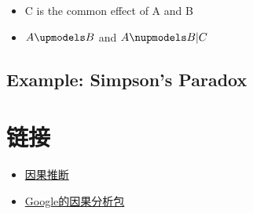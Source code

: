 \documentclass[]{book}
\providecommand{\tightlist}{%
  \setlength{\itemsep}{0pt}\setlength{\parskip}{0pt}}
\begin{document}
\begin{itemize}
\tightlist
\item
  C is the common effect of A and B
\item
  \(A \upmodels B\) and \(A \nupmodels B|C\)
\end{itemize}

\hypertarget{example-simpsons-paradox}{%
\subsection{Example: Simpson's Paradox}\label{example-simpsons-paradox}}

\hypertarget{yinguolink}{%
\section{链接}\label{yinguolink}}

\begin{itemize}
\tightlist
\item
  \href{https://cosx.org/2012/03/causality1-simpson-paradox}{因果推断}
\item
  \href{https://github.com/google/CausalImpact}{Google的因果分析包}
\end{itemize}
\end{document}
